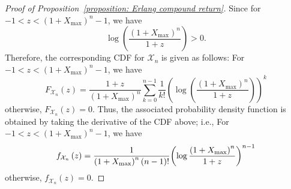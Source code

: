\documentclass[letterpaper, 10 pt, journal, twoside]{IEEEtran}  %
\begin{document}
\begin{proof}[Proof of Proposition~\ref{proposition: Erlang compound return}]
Since for $-1 < z < (1+X_{\max})^n -1 $, we have
\[\log \left( {\frac{{{{\left( {1 + {X_{\max }}} \right)}^n}}}{{1 + z}}} \right) > 0.
\]
Therefore, the corresponding CDF for $\mathcal{X}_n$ is given as follows: For $-1<z < {\left( {1 + X_{\max}} \right)^n} - 1$, we have
 $$
 F_{\mathcal{X}_n}(z ) =\frac{{1 + z}}{{{{\left( {1 + X_{\max}} \right)}^n}}}\sum_{k = 0}^{n - 1} {\frac{1}{{k!}}{{\left( {\log \left( {\frac{{{{\left( {1 + X_{\max}} \right)}^n}}}{{1 + z}}} \right)} \right)}^k}}
 $$
otherwise, $F_{\mathcal{X}_n}(z ) = 0.$
Thus, the associated probability density function is obtained by taking the derivative of the CDF above; i.e., For~${ - 1 < z < {{\left( {1 + {X_{\max }}} \right)}^n} - 1}$, we have
\[{f_{{\cal X}_n } }\left( z \right) = \frac{1}{{{{(1 + {X_{\max }})}^n}\left( {n - 1} \right)!}}{\left( {\log \frac{{{{(1 + {X_{\max }})}^n}}}{{1 + z}}} \right)^{n - 1}}\]	
otherwise, $f_{\mathcal{X}_n}(z)=0.$  
\end{proof}
 


          
\end{document}
